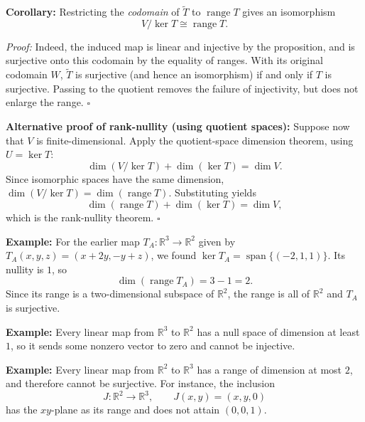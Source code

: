 \documentclass[a4paper,11pt,abstract=true]{scrartcl}
\theoremstyle{dotlessP}
\theoremstyle{dotlessS}
\theoremstyle{remark}
\theoremstyle{definition}
\begin{document}
\begin{problem_box}
\textbf{Corollary:}
Restricting the
\emph{codomain} of $\widetilde{T}$ to $\operatorname{range}T$ gives an
isomorphism
\[
V/\ker T\cong\operatorname{range}T.
\]
\end{problem_box}

\begin{claim_box}
\textit{Proof:} Indeed, the induced map is linear and injective by the
proposition,
and is surjective onto this codomain by the equality of ranges.
With its original codomain $W$, $\widetilde{T}$ is surjective (and hence
an isomorphism) if and only if $T$ is surjective. Passing to the quotient
removes the failure of injectivity, but does not enlarge the range.
\hfill$\square$
\end{claim_box}

\begin{claim_box}
\textbf{Alternative proof of rank-nullity (using quotient spaces):}
Suppose now that $V$ is finite-dimensional. Apply the quotient-space
dimension theorem, using $U=\ker T$:
\[
\dim(V/\ker T)+\dim(\ker T)=\dim V.
\]
Since isomorphic spaces have the same dimension,
$\dim(V/\ker T)=\dim(\operatorname{range}T)$. Substituting yields
\[
\dim(\operatorname{range}T)+\dim(\ker T)=\dim V,
\]
which is the rank-nullity theorem. \hfill$\square$
\end{claim_box}

\begin{example_box}
\textbf{Example:} For the earlier map
$T_A:\mathbb{R}^3\longrightarrow\mathbb{R}^2$ given by
$T_A(x,y,z)=(x+2y,-y+z)$, we found
$\ker T_A=\operatorname{span}\{(-2,1,1)\}$. Its nullity is $1$, so
\[
\dim(\operatorname{range}T_A)=3-1=2.
\]
Since its range is a two-dimensional subspace of $\mathbb{R}^2$, the
range is all of $\mathbb{R}^2$ and $T_A$ is surjective.
\end{example_box}

\begin{example_box}
\textbf{Example:} Every linear map from $\mathbb{R}^3$ to
$\mathbb{R}^2$ has a null space of dimension at least $1$, so it sends
some nonzero vector to zero and cannot be injective.
\end{example_box}

\begin{example_box}
\textbf{Example:} Every linear map from $\mathbb{R}^2$ to
$\mathbb{R}^3$ has a range of dimension at most $2$, and therefore cannot
be surjective. For instance, the inclusion
\[
J:\mathbb{R}^2\longrightarrow\mathbb{R}^3,
\qquad J(x,y)=(x,y,0)
\]
has the $xy$-plane as its range and does not attain $(0,0,1)$.
\end{example_box}
\end{document}
